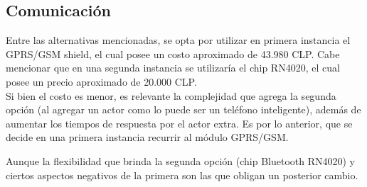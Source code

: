 \subsection{Comunicación}
Entre las alternativas mencionadas, se opta por utilizar en primera instancia el GPRS/GSM shield, el cual posee un costo aproximado de 43.980 CLP.
Cabe mencionar que en una segunda instancia se utilizaría el chip RN4020, el cual posee un precio aproximado de 20.000 CLP.\\
Si bien el costo es menor, es relevante la complejidad que agrega la segunda opción (al agregar un actor como lo puede ser un teléfono inteligente), además de aumentar los tiempos de respuesta por el actor extra. Es por lo anterior, que se decide en una primera instancia recurrir al módulo GPRS/GSM.

Aunque la flexibilidad que brinda la segunda opción (chip Bluetooth RN4020) y ciertos aspectos negativos de la primera son las que obligan un posterior cambio.